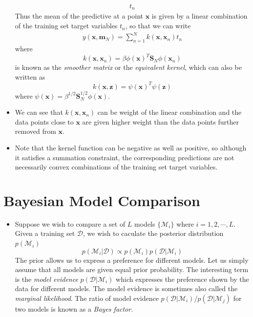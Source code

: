 \documentclass[12pt, a4paper]{article}
\begin{document}
\begin{itemize}
\begin{eqnarray}
            t_n
        \end{eqnarray}
        Thus the mean of the predictive at a point $\bm{x}$ is given by a linear combination of the 
        training set target variables $t_n$, so that we can write
        \begin{eqnarray}
            y(\bm{x},\bm{m}_N)=\sum_{n=1}^Nk(\bm{x},\bm{x}_n)t_n
        \end{eqnarray}
        where
        \begin{equation*}
            k(\bm{x},\bm{x}_n)=\beta\phi(\bm{x})^T\bm{S}_N\phi(\bm{x}_n)
        \end{equation*}
        is known as the \textit{smoother matrix} or the \textit{equivalent kernel}, which can also be 
        written as 
        \begin{equation*}
            k(\bm{x},\bm{z})=\psi(\bm{x})^T\psi(\bm{z})
        \end{equation*}
        where $\psi(\bm{x})=\beta^{1/2}\bm{S}_N^{1/2}\phi(\bm{x})$.
        \item We can see that $k(\bm{x},\bm{x}_n)$ can be weight of the linear combination and the data 
        points close to $\bm{x}$ are given higher weight than the data points further removed from $\bm{x}$.
        \item Note that the kernel function can be negative as well as positive, so although it satisfies
        a summation constraint, the corresponding predictions are not necessarily convex combinations of 
        the training set target variables.
    \end{itemize}
    \section{Bayesian Model Comparison}
    \begin{itemize}
        \item Suppose we wish to compare a set of $L$ models $\{\mathcal{M}_i\}$ where $i=1,2,\cdots,L$. 
        Given a training set $\mathcal{D}$, we wish to caculate the posterior distribution $p(\mathcal{M}_i)$
        \begin{equation*}
            p(\mathcal{M}_i|\mathcal{D})\propto p(\mathcal{M}_i)p(\mathcal{D}|\mathcal{M}_i)
        \end{equation*}
        The prior allows us to express a preference for different models. Let us simply assume that all models
        are given equal prior probability. The interesting term is the \textit{model evidence} $p(\mathcal{D}
        |\mathcal{M}_i)$ which expresses the preference shown by the data for different models. The model 
        evidence is sometimes also called the \textit{marginal likelihood}. The ratio of model evidence 
        $p(\mathcal{D}|\mathcal{M}_i)/p(\mathcal{D}|\mathcal{M}_j)$ for two models is known as a 
        \textit{Bayes factor}.
    \end{itemize}
\end{document}
